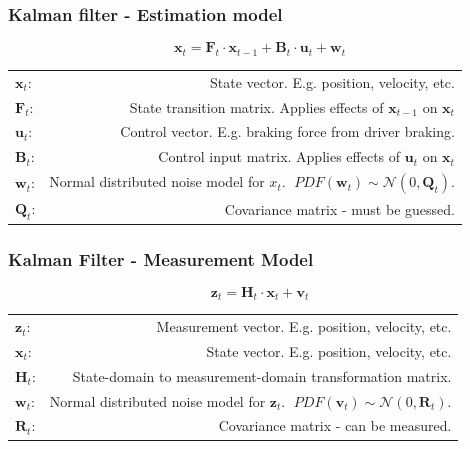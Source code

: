 \documentclass[10pt]{beamer}
\begin{document}
\begin{frame}
  \frametitle{Kalman filter - Estimation model}
  \begin{equation}
    \mathbf{x}_t = \mathbf{F}_t\cdot \mathbf{x}_{t-1} + \mathbf{B}_t\cdot \mathbf{u}_t + \mathbf{w}_t
  \end{equation}
  \begin{table}
    \begin{tabular}{@{} lr @{}}
      \toprule
      $\mathbf{x}_t$: & State vector. E.g. position, velocity, etc. \\
      $\mathbf{F}_t$: & State transition matrix. Applies effects of $\textbf{x}_{t-1}$ on $\textbf{x}_t$\\
      $\mathbf{u}_t$: & Control vector. E.g. braking force from driver braking.\\
      $\mathbf{B}_t$: & Control input matrix. Applies effects of $\textbf{u}_{t}$ on $\textbf{x}_t$\\
      $\mathbf{w}_t$: & Normal distributed noise model for $x_t$. $\;PDF(\mathbf{w}_t) \sim \mathcal{N}(0,\mathbf{Q}_t)$.\\ 
      $\mathbf{Q}_t$: & Covariance matrix - must be guessed.\\
      \bottomrule
    \end{tabular}
  \end{table}
\end{frame}

\begin{frame}
  \frametitle{Kalman Filter - Measurement Model}
  \begin{equation}
    \mathbf{z}_t = \mathbf{H}_t\cdot \mathbf{x}_{t} + \mathbf{v}_t
  \end{equation}
  \begin{table}
    \begin{tabular}{@{} lr @{}}
      \toprule
      $\mathbf{z}_t$: & Measurement vector. E.g. position, velocity, etc. \\
      $\mathbf{x}_t$: & State vector. E.g. position, velocity, etc. \\
      $\mathbf{H}_t$: & State-domain to measurement-domain transformation matrix.\\
      $\mathbf{w}_t$: & Normal distributed noise model for $\mathbf{z}_t$. $\;PDF(\mathbf{v}_t) \sim \mathcal{N}(0,\mathbf{R}_t)$.\\ 
      $\mathbf{R}_t$: & Covariance matrix - can be measured.\\
      \bottomrule
    \end{tabular}
  \end{table}
\end{frame}
\end{document}
